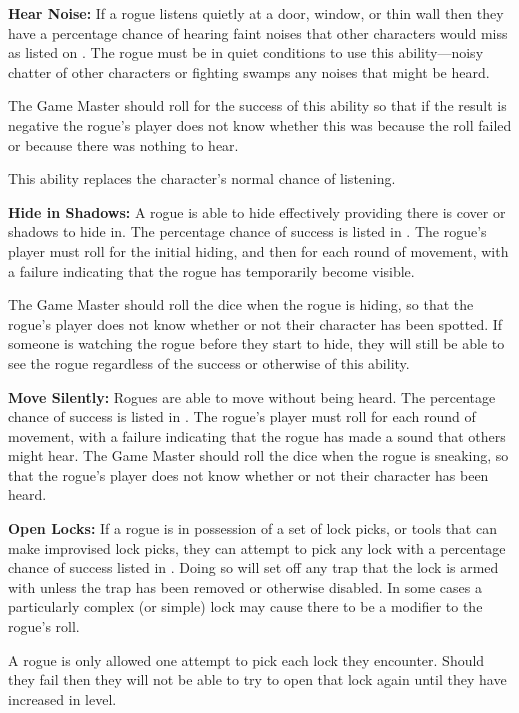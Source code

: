 \begin{multicols*}{2}
\textbf{Hear Noise:} If a rogue listens quietly at a door, window, or thin wall then they have a percentage chance of hearing faint noises that other characters would miss as listed on . The rogue must be in quiet conditions to use this ability—noisy chatter of other characters or fighting swamps any noises that might be heard.

The Game Master should roll for the success of this ability so that if the result is negative the rogue’s player does not know whether this was because the roll failed or because there was nothing to hear.

This ability replaces the character's normal chance of listening.

\textbf{Hide in Shadows:} A rogue is able to hide effectively providing there is cover or shadows to hide in. The percentage chance of success is listed in . The rogue’s player must roll for the initial hiding, and then for each round of movement, with a failure indicating that the rogue has temporarily become visible.

The Game Master should roll the dice when the rogue is hiding, so that the rogue’s player does not know whether or not their character has been spotted. If someone is watching the rogue before they start to hide, they will still be able to see the rogue regardless of the success or otherwise of this ability.

\textbf{Move Silently:}\label{sec:Move Silently} Rogues are able to move without being heard. The percentage chance of success is listed in . The rogue’s player must roll for each round of movement, with a failure indicating that the rogue has made a sound that others might hear. The Game Master should roll the dice when the rogue is sneaking, so that the rogue’s player does not know whether or not their character has been heard.

\textbf{Open Locks:}\label{sec:Open Locks} If a rogue is in possession of a set of lock picks, or tools that can make improvised lock picks, they can attempt to pick any lock with a percentage chance of success listed in . Doing so will set off any trap that the lock is armed with unless the trap has been removed or otherwise disabled. In some cases a particularly complex (or simple) lock may cause there to be a modifier to the rogue’s roll.

A rogue is only allowed one attempt to pick each lock they encounter. Should they fail then they will not be able to try to open that lock again until they have increased in level.


\end{multicols*}
